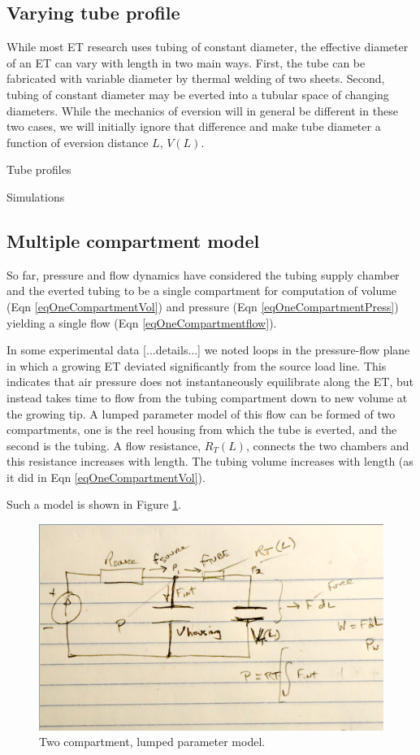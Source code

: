 \documentclass[letterpaper]{article}
\begin{document}
\subsection{Varying tube profile}

While most ET research uses tubing of constant diameter, the effective diameter of an ET can vary with
length in two main ways.   First, the tube can be fabricated with variable diameter by thermal welding of two sheets.
Second, tubing of constant diameter may be everted into a tubular space of changing diameters.
While the mechanics of eversion will in general be different in these two cases, we will initially ignore that difference
and make tube diameter a function of eversion distance $L$, $V(L)$.

Tube profiles

Simulations


\subsection{Multiple compartment model}
So far, pressure and flow dynamics have considered the tubing supply chamber and the everted tubing to be a single compartment
for computation of volume (Eqn \ref{eqOneCompartmentVol}) and pressure (Eqn \ref{eqOneCompartmentPress}) yielding a single
flow (Eqn \ref{eqOneCompartmentflow}).

In some experimental data [...details...]  we noted loops in the pressure-flow plane in which a growing ET deviated
significantly from the source load line.   This indicates that air pressure does not instantaneously equilibrate
along the ET, but instead takes time to flow from the tubing compartment down to new volume at the growing tip.
A lumped parameter model of this flow can be formed of two compartments, one is the reel housing from
which the tube is everted, and the second is
the tubing.   A flow resistance, $R_T(L)$, connects the two chambers and this resistance increases with length.
The tubing volume increases with length (as it did in Eqn \ref{eqOneCompartmentVol}).

Such a model is shown in Figure \ref{Fig:TwoCompartment}.


\begin{figure}[h]\centering
\includegraphics[width=.5\textwidth]{Figure_TwoCompartment.png}
\caption{Two compartment, lumped parameter model. }
\label{Fig:TwoCompartment}
\end{figure}
\end{document}

